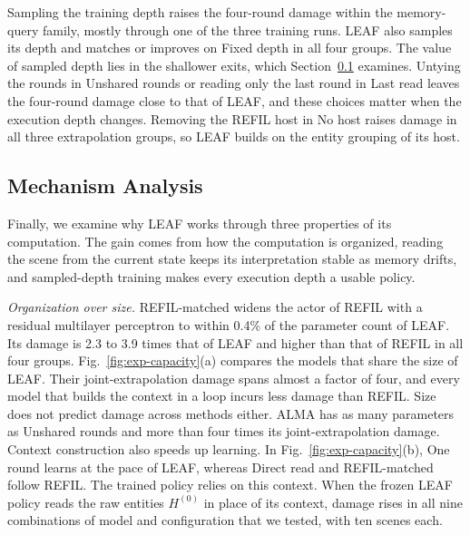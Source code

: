 Sampling the training depth raises the four-round damage within the memory-query family, mostly through one of the three training runs. LEAF also samples its depth and matches or improves on Fixed depth in all four groups. The value of sampled depth lies in the shallower exits, which Section~\ref{subsec:exp-mechanism} examines. Untying the rounds in Unshared rounds or reading only the last round in Last read leaves the four-round damage close to that of LEAF, and these choices matter when the execution depth changes. Removing the REFIL host in No host raises damage in all three extrapolation groups, so LEAF builds on the entity grouping of its host.

\subsection{Mechanism Analysis}
\label{subsec:exp-mechanism}

Finally, we examine why LEAF works through three properties of its computation. The gain comes from how the computation is organized, reading the scene from the current state keeps its interpretation stable as memory drifts, and sampled-depth training makes every execution depth a usable policy.

\emph{Organization over size.} REFIL-matched widens the actor of REFIL with a residual multilayer perceptron to within 0.4\% of the parameter count of LEAF. Its damage is 2.3 to 3.9 times that of LEAF and higher than that of REFIL in all four groups. Fig.~\ref{fig:exp-capacity}(a) compares the models that share the size of LEAF. Their joint-extrapolation damage spans almost a factor of four, and every model that builds the context in a loop incurs less damage than REFIL. Size does not predict damage across methods either. ALMA has as many parameters as Unshared rounds and more than four times its joint-extrapolation damage. Context construction also speeds up learning. In Fig.~\ref{fig:exp-capacity}(b), One round learns at the pace of LEAF, whereas Direct read and REFIL-matched follow REFIL. The trained policy relies on this context. When the frozen LEAF policy reads the raw entities $H^{(0)}$ in place of its context, damage rises in all nine combinations of model and configuration that we tested, with ten scenes each.

